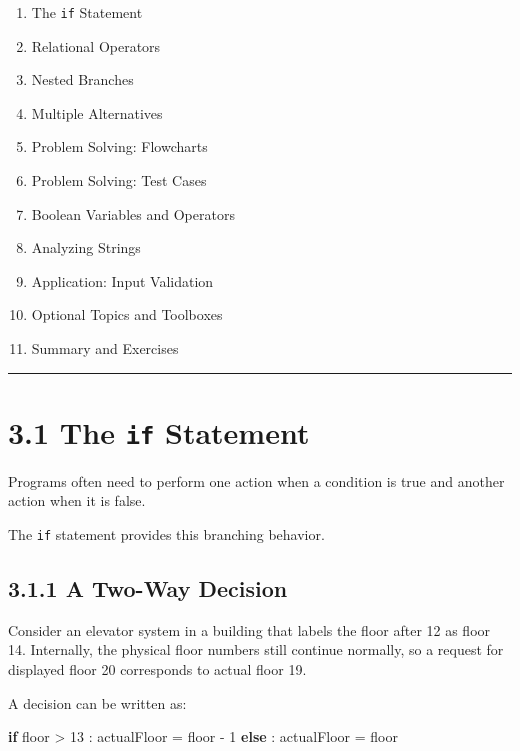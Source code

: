 \documentclass[
  11pt,
  a4paper,
]{article}
\newenvironment{Shaded}{}{}
\newcommand{\ControlFlowTok}[1]{\textcolor[rgb]{0.00,0.44,0.13}{\textbf{#1}}}
\newcommand{\DecValTok}[1]{\textcolor[rgb]{0.25,0.63,0.44}{#1}}
\newcommand{\NormalTok}[1]{#1}
\newcommand{\OperatorTok}[1]{\textcolor[rgb]{0.40,0.40,0.40}{#1}}
\providecommand{\tightlist}{%
  \setlength{\itemsep}{0pt}\setlength{\parskip}{0pt}}
\begin{document}
\begin{enumerate}
\def\labelenumi{\arabic{enumi}.}
\tightlist
\item
  The \texttt{if} Statement
\item
  Relational Operators
\item
  Nested Branches
\item
  Multiple Alternatives
\item
  Problem Solving: Flowcharts
\item
  Problem Solving: Test Cases
\item
  Boolean Variables and Operators
\item
  Analyzing Strings
\item
  Application: Input Validation
\item
  Optional Topics and Toolboxes
\item
  Summary and Exercises
\end{enumerate}

\begin{center}\rule{0.5\linewidth}{0.5pt}\end{center}

\section{\texorpdfstring{3.1 The \texttt{if}
Statement}{3.1 The if Statement}}\label{the-if-statement}

Programs often need to perform one action when a condition is true and
another action when it is false.

The \texttt{if} statement provides this branching behavior.

\subsection{3.1.1 A Two-Way Decision}\label{a-two-way-decision}

Consider an elevator system in a building that labels the floor after 12
as floor 14. Internally, the physical floor numbers still continue
normally, so a request for displayed floor 20 corresponds to actual
floor 19.

A decision can be written as:

\begin{Shaded}
\begin{Highlighting}[]
\ControlFlowTok{if}\NormalTok{ floor }\OperatorTok{\textgreater{}} \DecValTok{13}\NormalTok{ :}
\NormalTok{    actualFloor }\OperatorTok{=}\NormalTok{ floor }\OperatorTok{{-}} \DecValTok{1}
\ControlFlowTok{else}\NormalTok{ :}
\NormalTok{    actualFloor }\OperatorTok{=}\NormalTok{ floor}
\end{Highlighting}
\end{Shaded}
\end{document}
